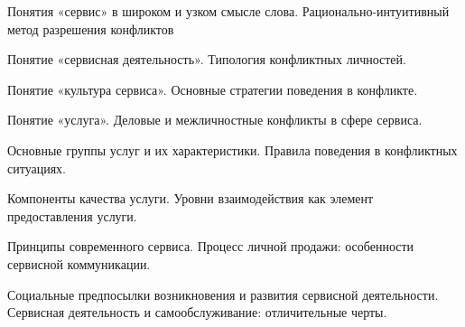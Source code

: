 \documentclass[
	14pt,
	a4paper,
	]
	{scrartcl}
\begin{document}
\shapk
{}
\setcounter{zad}{0}

\vfill
\z Понятия «сервис» в широком и узком смысле слова.
 \vfill
\z  Рационально-интуитивный метод разрешения конфликтов \vfill

\vfill

\newpage


\shapk
{}
\setcounter{zad}{0}

\vfill
\z Понятие «сервисная деятельность».
 \vfill
\z Типология конфликтных личностей.
 \vfill

\vfill

\newpage


\shapk
{}
\setcounter{zad}{0}

\vfill
\z Понятие «культура сервиса».
 \vfill
\z Основные стратегии поведения в конфликте.
 \vfill

\vfill

\newpage


\shapk
{}
\setcounter{zad}{0}

\vfill
\z Понятие «услуга».
 \vfill
\z Деловые и межличностные конфликты в сфере сервиса.
 \vfill

\vfill

\newpage


\shapk
{}
\setcounter{zad}{0}

\vfill
\z Основные группы услуг и их характеристики.
 \vfill
\z Правила поведения в конфликтных ситуациях.
 \vfill

\vfill

\newpage


\shapk
{}
\setcounter{zad}{0}

\vfill
\z Компоненты качества услуги.
 \vfill
\z Уровни взаимодействия как элемент предоставления услуги.
 \vfill

\vfill

\newpage


\shapk
{}
\setcounter{zad}{0}

\vfill
\z Принципы современного сервиса.
 \vfill
\z Процесс личной продажи: особенности сервисной коммуникации.
 \vfill

\vfill

\newpage


\shapk
{}
\setcounter{zad}{0}

\vfill
\z Социальные предпосылки возникновения и развития сервисной деятельности.
 \vfill
\z Сервисная деятельность и самообслуживание: отличительные черты.
 \vfill
\end{document}
